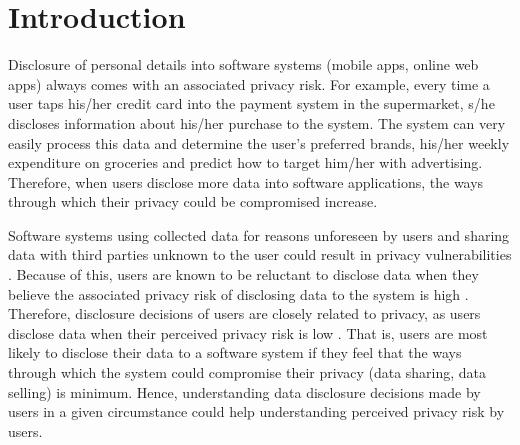 \documentclass[conference]{IEEEtran}
\begin{document}
\maketitle

\begin{abstract}


\end{abstract}


%
\IEEEpeerreviewmaketitle

\section{Introduction}

Disclosure of personal details into software systems (mobile apps, online web apps) always comes with an associated privacy risk. For example, every time a user taps his/her credit card into the payment system in the supermarket, s/he discloses information about his/her purchase to the system. The system can very easily process this data and determine the user's preferred brands, his/her weekly expenditure on groceries and predict how to target him/her with advertising. Therefore, when users disclose more data into software applications, the ways through which their privacy could be compromised increase. 

Software systems using collected data for reasons unforeseen by users and sharing data with third parties unknown to the user could result in privacy vulnerabilities \cite {malhotra2004internet}. Because of this, users are known to be reluctant to disclose data when they believe the associated privacy risk of disclosing data to the system is high \cite {kobsa2007privacy}. Therefore, disclosure decisions of users are closely related to privacy, as users disclose data when their perceived privacy risk is low  \cite {li2010understanding}. That is, users are most likely to disclose their data to a software system if they feel that the ways through which the system could compromise their privacy (data sharing, data selling) is minimum. Hence, understanding data disclosure decisions made by users in a given circumstance could help understanding perceived privacy risk by users. 
\end{document}
